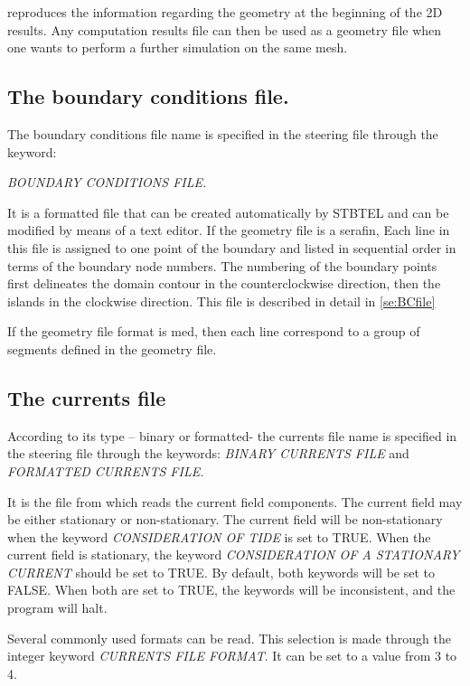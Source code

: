 \tomawac reproduces the information regarding the geometry at the beginning of the 2D
results. Any computation results file can then be used as a geometry file when one wants
to perform a further simulation on the same mesh.


\subsection{ The boundary conditions file. }

The boundary conditions file name is specified in the steering file through the
keyword: 

\textit{BOUNDARY CONDITIONS FILE.}

It is a formatted file that can be created automatically by STBTEL and can be modified
by means of a text editor.
If the geometry file is a serafin, Each line in this file is assigned to one point of
the boundary and listed in sequential order in terms of the boundary node numbers. The
numbering of the boundary points first delineates the domain contour in the
counterclockwise direction, then the islands in the clockwise direction. This file is
described in detail in \ref{se:BCfile}

If the geometry file format is med, then each line correspond to a group of segments
defined in the geometry file.

\subsection{ The currents file}
\label{se:currentfile}
According to its type -- binary or formatted- the currents file name is specified in
the steering file through the keywords: \textit{BINARY CURRENTS FILE} and\textit{
  FORMATTED CURRENTS FILE.}

It is the file from which \tomawac reads the current field components. The current
field may be either stationary or non-stationary. The current field will be
non-stationary when the keyword \textit{CONSIDERATION OF TIDE }is set to TRUE. When
the current field is stationary, the keyword \textit{CONSIDERATION OF A STATIONARY
  CURRENT} should be set to TRUE. By default, both keywords will be set to FALSE.
When both are set to TRUE, the keywords will be inconsistent, and the program will halt.

Several commonly used formats can be read. This selection is made through the integer
keyword \textit{CURRENTS FILE FORMAT}. It can be set to a value from 3 to 4.

